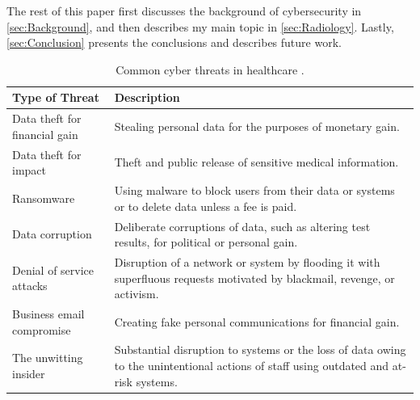 \documentclass[pdf,bookmarks,colorlinks=true]{IEEEtran}
\begin{document}
The rest of this paper first discusses the background of cybersecurity in
\ref{sec:Background}, and then describes my main topic in
\ref{sec:Radiology}. Lastly, \ref{sec:Conclusion} presents the
conclusions and describes future work.

\begin{table}[tbh]
	\caption{Common cyber threats in healthcare \cite{martin2017cybersecurity}.} 
	\begin{tabularx}{\textwidth}{|l|X|}
	\hline
	\textbf{Type of Threat} & \textbf{Description} \\ \hline \hline 
	Data theft for financial gain & Stealing personal data for the purposes of monetary gain. \\ \hline 
	Data theft for impact & Theft and public release of sensitive medical information. \\ \hline 
	Ransomware & Using malware to block users from their data or systems or to delete data unless a fee is paid. \\ \hline 
	Data corruption & Deliberate corruptions of data, such as altering test results, for political or personal gain. \\ \hline 
	Denial of service attacks & Disruption of a network or system by flooding it with superfluous requests motivated by blackmail, revenge, or activism. \\ \hline 
	Business email compromise & Creating fake personal communications for financial gain.\\ 
	The unwitting insider & Substantial disruption to systems or the loss of data owing to the unintentional actions of staff using outdated and at-risk systems. \\ \hline 
	\hline
	\end{tabularx}
	\label{tab:common}
\end{table}
\end{document}
